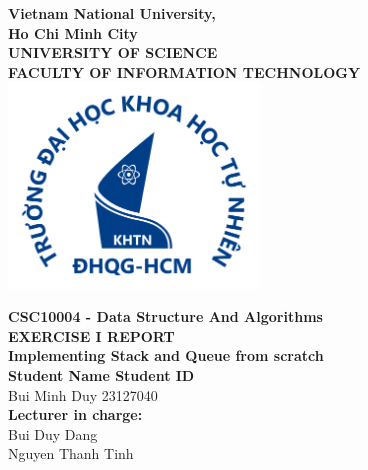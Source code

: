 \documentclass[a4paper, 12pt]{article}
\begin{document}
\begin{titlepage}
  \begin{center}
    \textbf{\LARGE Vietnam National University,}\\[0.5cm]
    \textbf{\LARGE Ho Chi Minh City}\\[0.5cm]
    \vspace{20pt}
    \textbf{\large UNIVERSITY OF SCIENCE}\\[0.2cm]
    \textbf{\large FACULTY OF INFORMATION TECHNOLOGY}\\[0.2cm]
    \vspace{20pt}
    \includegraphics[width=0.5\textwidth,keepaspectratio]{images/logo.png}

    \par
    \vspace{20pt}
    \textbf{\Large CSC10004 - Data Structure And Algorithms}\\
    \vspace{15pt}
    \myrule[1pt][7pt]
    \textbf{\LARGE EXERCISE I REPORT}\\
    \vspace{15pt}
    \textbf{\large Implementing Stack and Queue from scratch}\\
    \vspace{10pt}
    \myrule[1pt][7pt]
    \vspace{25pt}
    \textbf{\large Student Name \hspace{20pt} Student ID}\\
    Bui Minh Duy \hspace{45pt} 23127040 \\

    \vspace{45pt}
    \textbf {\large Lecturer in charge:}\\[0.2cm]
    \Large {Bui Duy Dang}\\[0.1cm]
    \Large {Nguyen Thanh Tinh}\\[0.1cm]
  \end{center}

  \par
  \vfill
  \begin{center}
    \\
  \end{center}

\end{titlepage}
\end{document}
